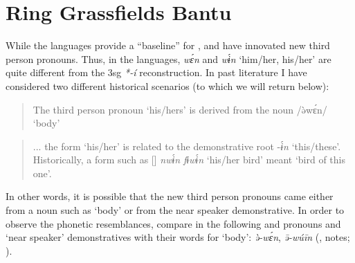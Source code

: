 \documentclass[output=paper]{langsci/langscibook}
\begin{document}
\section{Ring Grassfields Bantu}\label{sec:grassfields:4}

While the  languages provide a “baseline” for ,  and  have innovated new third person pronouns. Thus, in the  languages,  \textit{wɛ́}\textit{n} and  \textit{wɨ́}\textit{n} ‘him/her, his/her’ are quite different from the   3sg \textit{*-í} reconstruction. In past literature I have considered two different historical scenarios (to which we will return below):

\begin{quote}
The third person pronoun ‘his/hers’ is derived from the noun /ə̀wɛ́n/ ‘body’ \citep[245]{Hyman:Babanki}
\end{quote}

  
\begin{quote}
... the form ‘his/her’ is related to the demonstrative root -\textit{ɨ́n} ‘this/these’. Historically, a form such as [] \textit{nwɨ́n {\downstep}}\textit{fɨ{\downstep}}\textit{wɨ́n} ‘his/her bird’ meant ‘bird of this one’. \citep[29]{Hyman1979phonology}
\end{quote}


\largerpage[-1]
\noindent
In other words, it is possible that the new third person pronouns came either from a noun such as ‘body’ or from the near speaker demonstrative. In order to observe the phonetic resemblances, compare in  the following  and  pronouns and ‘near speaker’ demonstratives with their words for ‘body’:  \textit{ə̀-wɛ́n},  \textit{ə̄-wúīn} (\citealt{Hyman1980},  notes; \citealt{Jones2001}).
                                            
\end{document}
